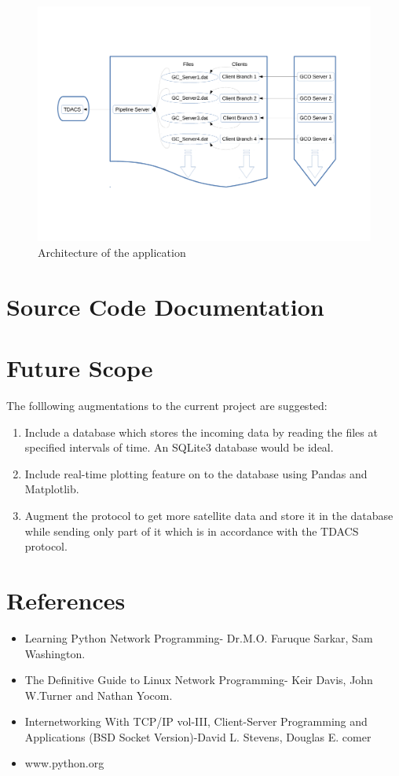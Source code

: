 \documentclass[12pt, a4paper]{report}
\begin{document}
\begin{figure}[!h]
	\centering
	\includegraphics[scale=0.4]{arch.pdf}
	\caption{Architecture of the application}
\end{figure}


\chapter{Source Code Documentation}



\chapter{Future Scope}
\par The folllowing augmentations to the current project are suggested:
\begin{enumerate}
	\item Include a database which stores the incoming data by reading the
		files at specified intervals of time. An SQLite3 database would be
		ideal.
	\item Include real-time plotting feature on to the database using Pandas
		and Matplotlib.
	\item Augment the protocol to get more satellite data and store it in the
		database while sending only part of it which is in accordance with the
		TDACS protocol.
\end{enumerate}


\chapter*{References}
	\begin{itemize}
			\item Learning Python Network Programming- Dr.M.O. Faruque Sarkar, Sam
					Washington.
			\item The Definitive Guide to Linux Network Programming- Keir Davis, John
					W.Turner and Nathan Yocom.
			\item Internetworking With TCP/IP vol-III, Client-Server Programming and
					Applications (BSD Socket Version)-David L. Stevens, Douglas E. comer
			\item www.python.org
	\end{itemize}
\end{document}
